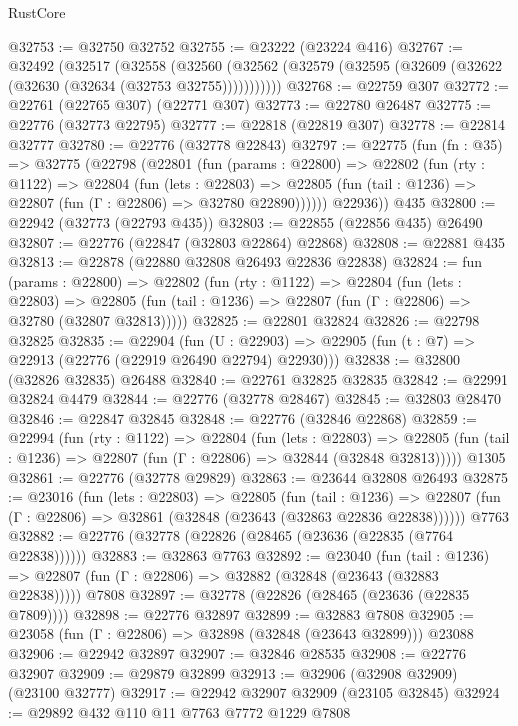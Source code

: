 \begin{lexlean}{RustCore}
\begin{coremodule}
@32753 := @32750 @32752
@32755 := @23222 (@23224 @416)
@32767 := @32492
    (@32517
      (@32558
        (@32560 (@32562 (@32579 (@32595 (@32609 (@32622 (@32630 (@32634 (@32753 @32755)))))))))))
@32768 := @22759 @307
@32772 := @22761 (@22765 @307) (@22771 @307)
@32773 := @22780 @26487
@32775 := @22776 (@32773 @22795)
@32777 := @22818 (@22819 @307)
@32778 := @22814 @32777
@32780 := @22776 (@32778 @22843)
@32797 := @22775
    (fun (fn : @35) =>
    @32775
      (@22798
        (@22801
          (fun (params : @22800) =>
          @22802
            (fun (rty : @1122) =>
            @22804
              (fun (lets : @22803) =>
              @22805 (fun (tail : @1236) => @22807 (fun (Γ : @22806) => @32780 @22890))))))
        @22936))
    @435
@32800 := @22942 (@32773 (@22793 @435))
@32803 := @22855 (@22856 @435) @26490
@32807 := @22776 (@22847 (@32803 @22864) @22868)
@32808 := @22881 @435
@32813 := @22878 (@22880 @32808 @26493 @22836 @22838)
@32824 := fun (params : @22800) =>
  @22802
    (fun (rty : @1122) =>
    @22804
      (fun (lets : @22803) =>
      @22805 (fun (tail : @1236) => @22807 (fun (Γ : @22806) => @32780 (@32807 @32813)))))
@32825 := @22801 @32824
@32826 := @22798 @32825
@32835 := @22904
    (fun (U : @22903) => @22905 (fun (t : @7) => @22913 (@22776 (@22919 @26490 @22794) @22930)))
@32838 := @32800 (@32826 @32835) @26488
@32840 := @22761 @32825 @32835
@32842 := @22991 @32824 @4479
@32844 := @22776 (@32778 @28467)
@32845 := @32803 @28470
@32846 := @22847 @32845
@32848 := @22776 (@32846 @22868)
@32859 := @22994
    (fun (rty : @1122) =>
    @22804
      (fun (lets : @22803) =>
      @22805 (fun (tail : @1236) => @22807 (fun (Γ : @22806) => @32844 (@32848 @32813)))))
    @1305
@32861 := @22776 (@32778 @29829)
@32863 := @23644 @32808 @26493
@32875 := @23016
    (fun (lets : @22803) =>
    @22805
      (fun (tail : @1236) =>
      @22807 (fun (Γ : @22806) => @32861 (@32848 (@23643 (@32863 @22836 @22838))))))
    @7763
@32882 := @22776 (@32778 (@22826 (@28465 (@23636 (@22835 (@7764 @22838))))))
@32883 := @32863 @7763
@32892 := @23040
    (fun (tail : @1236) => @22807 (fun (Γ : @22806) => @32882 (@32848 (@23643 (@32883 @22838)))))
    @7808
@32897 := @32778 (@22826 (@28465 (@23636 (@22835 @7809))))
@32898 := @22776 @32897
@32899 := @32883 @7808
@32905 := @23058 (fun (Γ : @22806) => @32898 (@32848 (@23643 @32899))) @23088
@32906 := @22942 @32897
@32907 := @32846 @28535
@32908 := @22776 @32907
@32909 := @29879 @32899
@32913 := @32906 (@32908 @32909) (@23100 @32777)
@32917 := @22942 @32907 @32909 (@23105 @32845)
@32924 := @29892 @432 @110 @11 @7763 @7772 @1229 @7808

\end{coremodule}
\end{lexlean}
